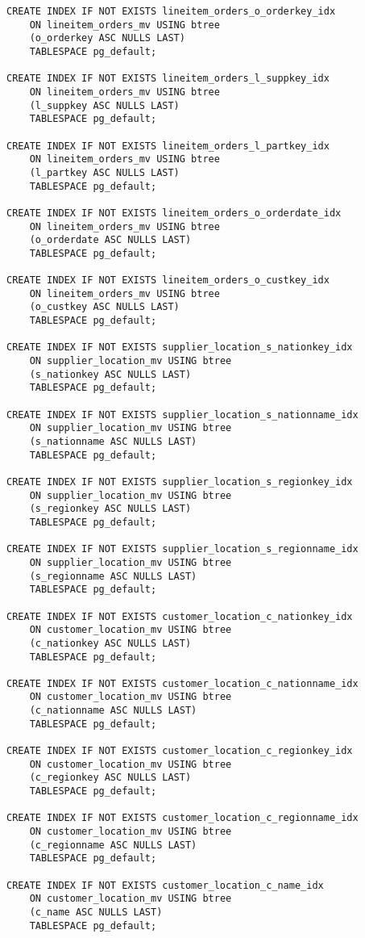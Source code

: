 \begin{lstlisting}
CREATE INDEX IF NOT EXISTS lineitem_orders_o_orderkey_idx
    ON lineitem_orders_mv USING btree
    (o_orderkey ASC NULLS LAST)
    TABLESPACE pg_default;

CREATE INDEX IF NOT EXISTS lineitem_orders_l_suppkey_idx
    ON lineitem_orders_mv USING btree
    (l_suppkey ASC NULLS LAST)
    TABLESPACE pg_default;
	
CREATE INDEX IF NOT EXISTS lineitem_orders_l_partkey_idx
    ON lineitem_orders_mv USING btree
    (l_partkey ASC NULLS LAST)
    TABLESPACE pg_default;

CREATE INDEX IF NOT EXISTS lineitem_orders_o_orderdate_idx
    ON lineitem_orders_mv USING btree
    (o_orderdate ASC NULLS LAST)
    TABLESPACE pg_default;

CREATE INDEX IF NOT EXISTS lineitem_orders_o_custkey_idx
    ON lineitem_orders_mv USING btree
    (o_custkey ASC NULLS LAST)
    TABLESPACE pg_default;

CREATE INDEX IF NOT EXISTS supplier_location_s_nationkey_idx
	ON supplier_location_mv USING btree
	(s_nationkey ASC NULLS LAST)
	TABLESPACE pg_default;

CREATE INDEX IF NOT EXISTS supplier_location_s_nationname_idx
	ON supplier_location_mv USING btree
	(s_nationname ASC NULLS LAST)
	TABLESPACE pg_default;

CREATE INDEX IF NOT EXISTS supplier_location_s_regionkey_idx
	ON supplier_location_mv USING btree
	(s_regionkey ASC NULLS LAST)
	TABLESPACE pg_default;

CREATE INDEX IF NOT EXISTS supplier_location_s_regionname_idx
	ON supplier_location_mv USING btree
	(s_regionname ASC NULLS LAST)
	TABLESPACE pg_default;

CREATE INDEX IF NOT EXISTS customer_location_c_nationkey_idx
	ON customer_location_mv USING btree
	(c_nationkey ASC NULLS LAST)
	TABLESPACE pg_default;

CREATE INDEX IF NOT EXISTS customer_location_c_nationname_idx
	ON customer_location_mv USING btree
	(c_nationname ASC NULLS LAST)
	TABLESPACE pg_default;

CREATE INDEX IF NOT EXISTS customer_location_c_regionkey_idx
	ON customer_location_mv USING btree
	(c_regionkey ASC NULLS LAST)
	TABLESPACE pg_default;

CREATE INDEX IF NOT EXISTS customer_location_c_regionname_idx
	ON customer_location_mv USING btree
	(c_regionname ASC NULLS LAST)
	TABLESPACE pg_default;

CREATE INDEX IF NOT EXISTS customer_location_c_name_idx
	ON customer_location_mv USING btree
	(c_name ASC NULLS LAST)
	TABLESPACE pg_default;
\end{lstlisting}

